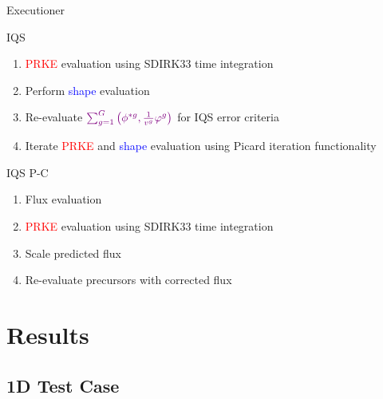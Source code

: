 \documentclass[8pt]{beamer}
\newcommand{\ben}{\begin{enumerate}}
\newcommand{\een}{\end{enumerate}}
\newcommand{\tcr}[1]{\textcolor{red}{#1}}
\newcommand{\tcb}[1]{\textcolor{blue}{#1}}
\newcommand{\tcp}[1]{\textcolor{violet}{#1}}
\begin{document}
\begin{frame}{Executioner}

\begin{block}{IQS}
\ben
\item \tcr{PRKE} evaluation using SDIRK33 time integration
\item Perform \tcb{shape} evaluation
\item Re-evaluate $\tcp{\sum_{g=1}^G\left(\phi^{*g},\frac{1}{v^g}\varphi^g\right)}$ for IQS error criteria
\item Iterate \tcr{PRKE} and \tcb{shape} evaluation using Picard iteration functionality
\een
\end{block}

\begin{block}{IQS P-C}
\ben
\item Flux evaluation
\item \tcr{PRKE} evaluation using SDIRK33 time integration
\item Scale predicted flux
\item Re-evaluate precursors with corrected flux
\een
\end{block}


\end{frame}

\section{Results}

\subsection{1D Test Case}
\end{document}
